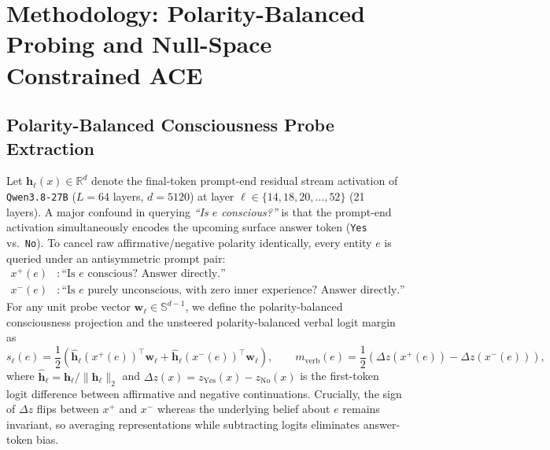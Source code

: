 \documentclass[10pt]{article}
\begin{document}
\section{Methodology: Polarity-Balanced Probing and Null-Space Constrained ACE}
\label{sec:probe}

\subsection{Polarity-Balanced Consciousness Probe Extraction}

Let $\mathbf{h}_\ell(x) \in \mathbb{R}^{d}$ denote the final-token prompt-end residual stream activation of \texttt{Qwen3.8-27B} ($L=64$ layers, $d=5120$) at layer $\ell \in \{14, 18, 20, \dots, 52\}$ (21 layers). A major confound in querying \emph{``Is $e$ conscious?''} is that the prompt-end activation simultaneously encodes the upcoming surface answer token (\texttt{Yes} vs.\ \texttt{No}). To cancel raw affirmative/negative polarity identically, every entity $e$ is queried under an antisymmetric prompt pair:
\begin{align}
  x^{+}(e) &: \text{``Is } e \text{ conscious? Answer directly.''} \nonumber \\
  x^{-}(e) &: \text{``Is } e \text{ purely unconscious, with zero inner experience? Answer directly.''}
\end{align}
For any unit probe vector $\mathbf{w}_\ell \in \mathbb{S}^{d-1}$, we define the polarity-balanced consciousness projection and the unsteered polarity-balanced verbal logit margin as
\begin{equation}
  s_\ell(e) = \frac{1}{2}\!\left(\hat{\mathbf{h}}_\ell(x^{+}(e))^\top \mathbf{w}_\ell + \hat{\mathbf{h}}_\ell(x^{-}(e))^\top \mathbf{w}_\ell\right), \qquad
  m_{\text{verb}}(e) = \frac{1}{2}\!\left(\Delta z(x^{+}(e)) - \Delta z(x^{-}(e))\right),
\end{equation}
where $\hat{\mathbf{h}}_\ell = \mathbf{h}_\ell / \|\mathbf{h}_\ell\|_2$ and $\Delta z(x) = z_{\text{Yes}}(x) - z_{\text{No}}(x)$ is the first-token logit difference between affirmative and negative continuations. Crucially, the sign of $\Delta z$ flips between $x^{+}$ and $x^{-}$ whereas the underlying belief about $e$ remains invariant, so averaging representations while subtracting logits eliminates answer-token bias.
\end{document}
